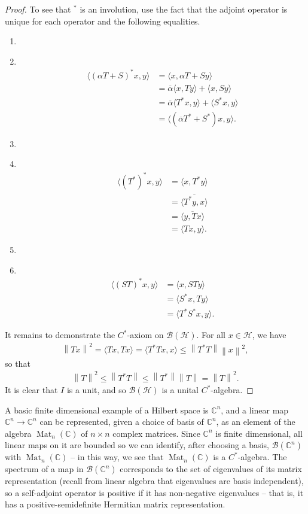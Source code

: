 \documentclass[11pt,a4paper]{report}
\theoremstyle{plain}
\theoremstyle{definition}
\newcommand{\1}{\mathbbm{1}}
\newcommand{\C}{\mathbb{C}}
\renewcommand{\H}{\mathcal{H}}
\newcommand{\B}{\mathcal{B}}
\newcommand{\BH}{\mathcal{\B(\H)}}
\newcommand\Item[1][]{ 						%
  \ifx\relax#1\relax  \item \else \item[#1] \fi
  \abovedisplayskip=0pt\abovedisplayshortskip=0pt~\vspace*{-\baselineskip}}
\DeclareMathOperator{\Mat}{\operatorname{Mat}}
\begin{document}
\begin{proof}
	To see that $^\ast$ is an involution, use the fact that the adjoint 
	operator is unique for each operator and the following equalities.
	\begin{enumerate}
	\Item	\begin{align*}
				\langle (\alpha T+S)^\ast x,y\rangle 
			&=	\langle x, \alpha T+S y \rangle												\\
			&=	\overline{\alpha}\langle x,Ty\rangle + \langle x, Sy \rangle				\\
			&=	\overline{\alpha}\langle T^\ast x,y\rangle +
										 \langle S^\ast x, y \rangle						\\
			&=	\langle(\overline{\alpha} T^\ast + S^\ast) x, y \rangle.
			\end{align*}
	\Item 	\begin{align*}
				\langle (T^\ast)^\ast x,y\rangle 
			&=	\langle x, T^\ast y \rangle													\\
			&=	\overline{\langle T^\ast y,x \rangle}										\\
			&=	\overline{\langle y, Tx \rangle}											\\
			&=	\langle Tx,y\rangle.
			\end{align*}
	\Item	\begin{align*}
				\langle (ST)^\ast x,y \rangle
			&=	\langle x, STy \rangle														\\
			&=	\langle	S^\ast x,Ty \rangle													\\
			&=	\langle T^\ast S^\ast x,y \rangle.
		\end{align*}
	\end{enumerate}
	It remains to demonstrate the $C^\ast$-axiom on $\BH$. For all $x\in\H$, we have
	\begin{align*}
		\left\|Tx\right\|^2 = \langle Tx,Tx\rangle 
							=  \langle T^\ast Tx,x\rangle 
							\leq \left\|T^\ast T\right\| \left\|x\right\|^2,
	\end{align*}
	so that
	\begin{align*}
		\left\|T\right\|^2 	\leq \left\|T^\ast T\right\| 
							\leq \left\|T^\ast\right\| \left\|T\right\| 
							= \left\|T\right\|^2.
	\end{align*}
	It is clear that $I$ is a unit, and so $\BH$ is a unital $C^\ast$-algebra.
\end{proof} 

A basic finite dimensional example of a Hilbert space is $\C^n$, and a linear 
map $\C^n\to\C^n$ can be represented, given a choice of basis of $\C^n$, as an 
element of the algebra $\Mat_n(\C)$ of $n\times n$ complex matrices. Since 
$\C^n$ is finite dimensional, all linear maps on it are bounded so we can 
identify, after choosing a basis, $\B(\C^n)$ with $\Mat_n(\C)$ -- in this way, 
we see that $\Mat_n(\C)$ is a $C^\ast$-algebra.
The spectrum of a map in $\B(\C^n)$ corresponds to the set of eigenvalues of 
its matrix representation (recall from linear algebra that eigenvalues are 
basis independent), so a self-adjoint operator is positive if it has 
non-negative eigenvalues -- that is, it has a positive-semidefinite Hermitian
matrix representation.
\end{document}
